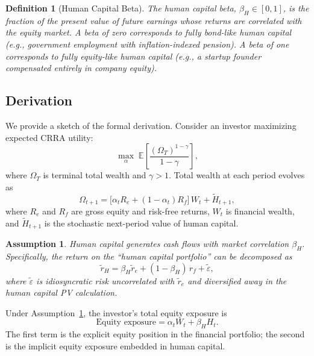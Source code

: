 \documentclass[11pt]{article}
\newtheorem{assumption}{Assumption}
\newtheorem{definition}{Definition}
\begin{document}
\begin{definition}[Human Capital Beta]\label{def:beta}
The \emph{human capital beta}, $\beta_H \in [0,1]$, is the fraction of
the present value of future earnings whose returns are correlated with
the equity market. A beta of zero corresponds to fully bond-like human
capital (e.g., government employment with inflation-indexed pension). A
beta of one corresponds to fully equity-like human capital (e.g., a
startup founder compensated entirely in company equity).
\end{definition}

\subsection{Derivation}\label{sec:derivation}

We provide a sketch of the formal derivation. Consider an investor
maximizing expected CRRA utility:
\begin{equation}
  \max_{\alpha}\; \mathbb{E}\!\left[\frac{(\Omega_T)^{1-\gamma}}{1-\gamma}\right],
\end{equation}
where $\Omega_T$ is terminal total wealth and $\gamma > 1$. Total wealth
at each period evolves as
\begin{equation}
  \Omega_{t+1} = \bigl[\alpha_t R_e + (1-\alpha_t) R_f\bigr]\,W_t + \tilde{H}_{t+1},
\end{equation}
where $R_e$ and $R_f$ are gross equity and risk-free returns, $W_t$ is
financial wealth, and $\tilde{H}_{t+1}$ is the stochastic next-period
value of human capital.

\begin{assumption}\label{as:beta}
Human capital generates cash flows with market correlation $\beta_H$.
Specifically, the return on the ``human capital portfolio'' can be
decomposed as
\begin{equation}
  \tilde{r}_H = \beta_H \tilde{r}_e + (1-\beta_H)\,r_f + \tilde{\varepsilon},
\end{equation}
where $\tilde{\varepsilon}$ is idiosyncratic risk uncorrelated with
$\tilde{r}_e$ and diversified away in the human capital PV calculation.
\end{assumption}

Under Assumption~\ref{as:beta}, the investor's total equity exposure is
\begin{equation}
  \text{Equity exposure} = \alpha_t W_t + \beta_H H_t.
\end{equation}
The first term is the explicit equity position in the financial portfolio;
the second is the implicit equity exposure embedded in human capital.
\end{document}

